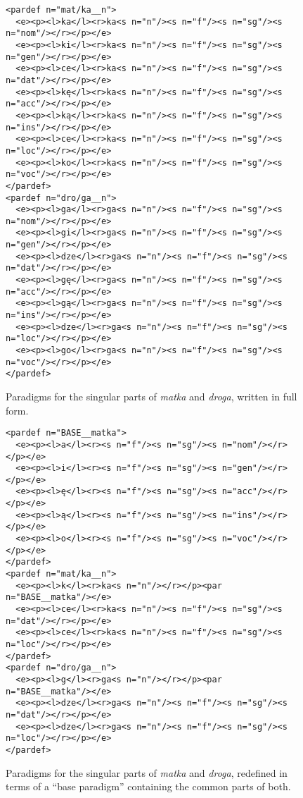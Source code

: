 \documentclass[11pt]{article}
\begin{document}
\begin{figure*}
\begin{small}
\begin{verbatim}
<pardef n="mat/ka__n">
  <e><p><l>ka</l><r>ka<s n="n"/><s n="f"/><s n="sg"/><s n="nom"/></r></p></e>
  <e><p><l>ki</l><r>ka<s n="n"/><s n="f"/><s n="sg"/><s n="gen"/></r></p></e>
  <e><p><l>ce</l><r>ka<s n="n"/><s n="f"/><s n="sg"/><s n="dat"/></r></p></e>
  <e><p><l>kę</l><r>ka<s n="n"/><s n="f"/><s n="sg"/><s n="acc"/></r></p></e>
  <e><p><l>ką</l><r>ka<s n="n"/><s n="f"/><s n="sg"/><s n="ins"/></r></p></e>
  <e><p><l>ce</l><r>ka<s n="n"/><s n="f"/><s n="sg"/><s n="loc"/></r></p></e>
  <e><p><l>ko</l><r>ka<s n="n"/><s n="f"/><s n="sg"/><s n="voc"/></r></p></e>
</pardef>
<pardef n="dro/ga__n">
  <e><p><l>ga</l><r>ga<s n="n"/><s n="f"/><s n="sg"/><s n="nom"/></r></p></e>
  <e><p><l>gi</l><r>ga<s n="n"/><s n="f"/><s n="sg"/><s n="gen"/></r></p></e>
  <e><p><l>dze</l><r>ga<s n="n"/><s n="f"/><s n="sg"/><s n="dat"/></r></p></e>
  <e><p><l>gę</l><r>ga<s n="n"/><s n="f"/><s n="sg"/><s n="acc"/></r></p></e>
  <e><p><l>gą</l><r>ga<s n="n"/><s n="f"/><s n="sg"/><s n="ins"/></r></p></e>
  <e><p><l>dze</l><r>ga<s n="n"/><s n="f"/><s n="sg"/><s n="loc"/></r></p></e>
  <e><p><l>go</l><r>ga<s n="n"/><s n="f"/><s n="sg"/><s n="voc"/></r></p></e>
</pardef>
\end{verbatim}
\end{small}
\caption{Paradigms for the singular parts of 
\emph{matka} and \emph{droga}, written in full form.\label{fig:pardefs}}
\end{figure*}
\begin{figure*}
\begin{small}
\begin{verbatim}
<pardef n="BASE__matka">
  <e><p><l>a</l><r><s n="f"/><s n="sg"/><s n="nom"/></r></p></e>
  <e><p><l>i</l><r><s n="f"/><s n="sg"/><s n="gen"/></r></p></e>
  <e><p><l>ę</l><r><s n="f"/><s n="sg"/><s n="acc"/></r></p></e>
  <e><p><l>ą</l><r><s n="f"/><s n="sg"/><s n="ins"/></r></p></e>
  <e><p><l>o</l><r><s n="f"/><s n="sg"/><s n="voc"/></r></p></e>
</pardef>
<pardef n="mat/ka__n">
  <e><p><l>k</l><r>ka<s n="n"/></r></p><par n="BASE__matka"/></e>
  <e><p><l>ce</l><r>ka<s n="n"/><s n="f"/><s n="sg"/><s n="dat"/></r></p></e>
  <e><p><l>ce</l><r>ka<s n="n"/><s n="f"/><s n="sg"/><s n="loc"/></r></p></e>
</pardef>
<pardef n="dro/ga__n">
  <e><p><l>g</l><r>ga<s n="n"/></r></p><par n="BASE__matka"/></e>
  <e><p><l>dze</l><r>ga<s n="n"/><s n="f"/><s n="sg"/><s n="dat"/></r></p></e>
  <e><p><l>dze</l><r>ga<s n="n"/><s n="f"/><s n="sg"/><s n="loc"/></r></p></e>
</pardef>
\end{verbatim}
\end{small}
\caption{Paradigms for the singular parts of \emph{matka} and \emph{droga}, redefined in terms of 
a ``base paradigm'' containing the common parts of both.
\label{fig:basepardefs}}
\end{figure*}
\end{document}
